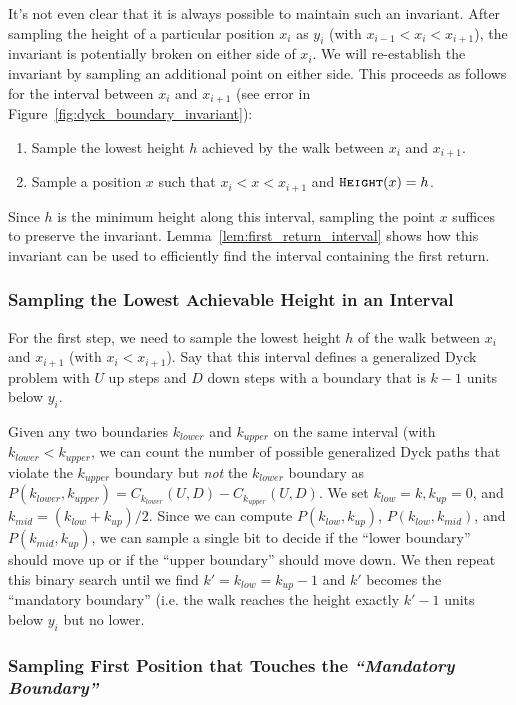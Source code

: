 It's not even clear that it is always possible to maintain such an invariant.
After sampling the height of a particular position $x_i$ as $y_i$ (with $x_{i-1} < x_i < x_{i+1}$),
the invariant is potentially broken on either side of $x_i$.
We will re-establish the invariant by sampling an additional point on either side.
This proceeds as follows for the interval between $x_i$ and $x_{i+1}$
(see error in Figure~\ref{fig:dyck_boundary_invariant}):
\begin{enumerate}
    \item Sample the lowest height $h$ achieved by the walk between $x_i$ and $x_{i+1}$.
    \item Sample a position $x$ such that $x_i < x < x_{i+1}$ and $\texttt{\textsc{Height}}(x) = h$.
\end{enumerate}
Since $h$ is the minimum height along this interval, sampling the point $x$ suffices to preserve the invariant.
Lemma~\ref{lem:first_return_interval} shows how this invariant can be used to efficiently find the interval containing the first return.


\subsubsection{Sampling the Lowest Achievable Height in an Interval}%
\label{sec:sampling_the_lowest_achievable_height}
For the first step, we need to sample the lowest height $h$ of the walk between $x_i$ and $x_{i+1}$ (with $x_i < x_{i+1}$).
Say that this interval defines a generalized Dyck problem with $U$ up steps and $D$ down steps with a boundary that is $k-1$ units below $y_i$.

Given any two boundaries $k_{lower}$ and $k_{upper}$ on the same interval (with $k_{lower} < k_{upper}$,
we can count the number of possible generalized Dyck paths that violate the $k_{upper}$ boundary but \emph{not} the $k_{lower}$ boundary as
$P(k_{lower}, k_{upper}) = C_{k_{lower}}(U,D) - C_{k_{upper}}(U,D)$.
We set $k_{low} = k, k_{up} = 0$, and $k_{mid} = (k_{low} + k_{up})/2$.
Since we can compute $P(k_{low},k_{up})$, $P(k_{low},k_{mid})$, and $P(k_{mid},k_{up})$,
we can sample a single bit to decide if the ``lower boundary'' should move up or if the ``upper boundary'' should move down.
We then repeat this binary search until we find $k' = k_{low} = k_{up}-1$ and $k'$ becomes the ``mandatory boundary''
(i.e. the walk reaches the height exactly $k'-1$ units below $y_i$ but no lower.



\subsubsection{Sampling First Position that Touches the \emph{``Mandatory Boundary''}}%
\label{sec:sampling_first_position_touching_mandatory_boundary}


